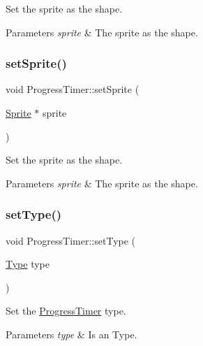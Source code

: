 Set the sprite as the shape.


\begin{DoxyParams}{Parameters}
{\em sprite} & The sprite as the shape. \\
\hline
\end{DoxyParams}
\mbox{\label{classProgressTimer_a3910e7c59c07732edcc2039dacbe7172}} 
\subsubsection{\texorpdfstring{set\+Sprite()}{setSprite()}\hspace{0.1cm}{\footnotesize\ttfamily [2/2]}}
{\footnotesize\ttfamily void Progress\+Timer\+::set\+Sprite (\begin{DoxyParamCaption}\item[{\hyperlink{classSprite}{Sprite} $\ast$}]{sprite }\end{DoxyParamCaption})}

Set the sprite as the shape.


\begin{DoxyParams}{Parameters}
{\em sprite} & The sprite as the shape. \\
\hline
\end{DoxyParams}
\mbox{\label{classProgressTimer_abe2478baf4201427691e7bd615151c19}} 
\subsubsection{\texorpdfstring{set\+Type()}{setType()}\hspace{0.1cm}{\footnotesize\ttfamily [1/2]}}
{\footnotesize\ttfamily void Progress\+Timer\+::set\+Type (\begin{DoxyParamCaption}\item[{\hyperlink{classProgressTimer_a9638d092b86d51bce727621b1a70d32f}{Type}}]{type }\end{DoxyParamCaption})}

Set the \hyperlink{classProgressTimer}{Progress\+Timer} type.


\begin{DoxyParams}{Parameters}
{\em type} & Is an Type. \\
\hline
\end{DoxyParams}
\mbox{\label{classProgressTimer_abe2478baf4201427691e7bd615151c19}} 
